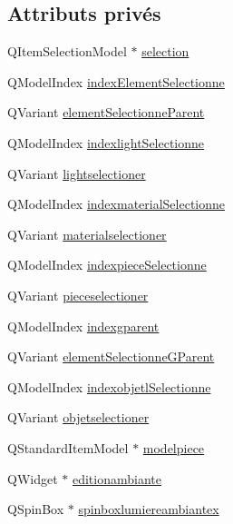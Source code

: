 \subsection*{Attributs privés}
\begin{DoxyCompactItemize}
\item 
Q\+Item\+Selection\+Model $\ast$ \hyperlink{class_mondock_aa0a94c4bfce0d7d4f2547da10d365275}{selection}
\item 
Q\+Model\+Index \hyperlink{class_mondock_a48e5355dbb076ca71a13e42172f342ca}{index\+Element\+Selectionne}
\item 
Q\+Variant \hyperlink{class_mondock_a5a0f5cf7817eee757956874e3bec2043}{element\+Selectionne\+Parent}
\item 
Q\+Model\+Index \hyperlink{class_mondock_ac8fa555c082f94d22d369eed852f93c3}{indexlight\+Selectionne}
\item 
Q\+Variant \hyperlink{class_mondock_a35acbdbc03ccc8bd255083f8499188f5}{lightselectioner}
\item 
Q\+Model\+Index \hyperlink{class_mondock_a8816860ad6351028d8d4e5b022b2b266}{indexmaterial\+Selectionne}
\item 
Q\+Variant \hyperlink{class_mondock_a09fab02186d86e999d23b4f9c667353f}{materialselectioner}
\item 
Q\+Model\+Index \hyperlink{class_mondock_ab950bd39d928049d2788f4690ba45755}{indexpiece\+Selectionne}
\item 
Q\+Variant \hyperlink{class_mondock_acc6d9454fd6ff20be6309e30aa5053c3}{pieceselectioner}
\item 
Q\+Model\+Index \hyperlink{class_mondock_a54452b93781c23fe0e40d764b2d278fe}{indexgparent}
\item 
Q\+Variant \hyperlink{class_mondock_a3c00ae3b69dc59785835aa2d04b73392}{element\+Selectionne\+G\+Parent}
\item 
Q\+Model\+Index \hyperlink{class_mondock_ab7756e9a6862132ca6b86d4b94c834c0}{indexobjetl\+Selectionne}
\item 
Q\+Variant \hyperlink{class_mondock_aba0697efe8eb1eff576ce6599aea10f3}{objetselectioner}
\item 
Q\+Standard\+Item\+Model $\ast$ \hyperlink{class_mondock_a2560c460ea144a4e8b2300dadf8df8ed}{modelpiece}
\item 
Q\+Widget $\ast$ \hyperlink{class_mondock_a958707eb3e7ab57d99934c167106dd0d}{editionambiante}
\item 
Q\+Spin\+Box $\ast$ \hyperlink{class_mondock_ae8eeb7a414be5aca3c4e893697f8970b}{spinboxlumiereambiantex}
\item 

\end{DoxyCompactItemize}
